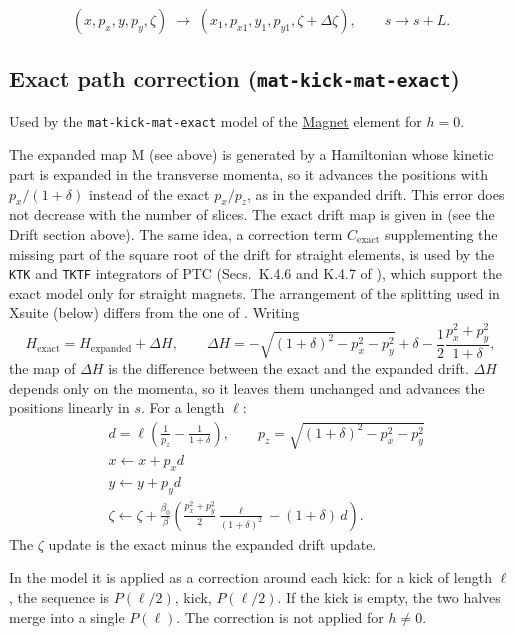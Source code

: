 \begin{equation}
(x,p_x,y,p_y,\zeta)
\;\longrightarrow\;
(x_1,p_{x1},y_1,p_{y1},\zeta+\Delta\zeta),
\qquad
s \rightarrow s+L .
\end{equation}


\subsection{Exact path correction (\texttt{mat-kick-mat-exact})}
\label{sec:path_correction}

Used by the \texttt{mat-kick-mat-exact} model of the
\href{https://xsuite.readthedocs.io/en/latest/apireference.html#magnet}{\underline{Magnet}}
element for $h=0$.

The expanded map M (see above) is generated by a Hamiltonian whose kinetic
part is expanded in the transverse momenta, so it advances the positions with
$p_x/(1+\delta)$ instead of the exact $p_x/p_z$, as in the expanded drift. This
error does not decrease with the number of slices. The exact drift map is
given in \cite{ptc_report} (see the Drift section above). The same idea, a
correction term $C_\text{exact}$ supplementing the missing part of the square
root of the drift for straight elements, is used by the \texttt{KTK} and
\texttt{TKTF} integrators of PTC (Secs.~K.4.6 and K.4.7 of \cite{ptc_report}),
which support the exact model only for straight magnets. The arrangement of the
splitting used in Xsuite (below) differs from the one of \cite{ptc_report}.
Writing
\[
  H_\text{exact} = H_\text{expanded} + \Delta H, \qquad
  \Delta H = -\sqrt{(1+\delta)^2 - p_x^2 - p_y^2}
    + \delta - \frac{1}{2}\frac{p_x^2+p_y^2}{1+\delta},
\]
the map of $\Delta H$ is the difference between the exact and the expanded
drift. $\Delta H$ depends only on the momenta, so it leaves them unchanged and
advances the positions linearly in $s$. For a length $\ell$:
\begin{align}
  &d = \ell\left(\frac{1}{p_z} - \frac{1}{1+\delta}\right),
    \qquad p_z = \sqrt{(1+\delta)^2 - p_x^2 - p_y^2} \\
  &x \leftarrow x + p_x d \\
  &y \leftarrow y + p_y d \\
  &\zeta \leftarrow \zeta + \frac{\beta_0}{\beta}\left(
    \frac{p_x^2 + p_y^2}{2}\frac{\ell}{(1+\delta)^2} - (1+\delta)\, d\right).
\end{align}
The $\zeta$ update is the exact minus the expanded drift update.

In the model it is applied as a correction around each kick: for a kick of length
$\ell$, the sequence is $P(\ell/2)$, kick, $P(\ell/2)$. If the kick is empty,
the two halves merge into a single $P(\ell)$. The correction is not applied for $h\neq0$.
